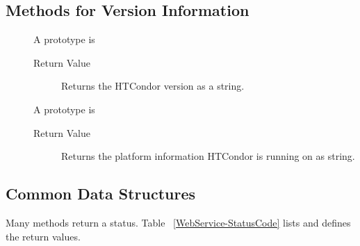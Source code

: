 \subsection{\label{WebService-VersionInformation} Methods for Version Information}

\begin{description}
\item []
  A prototype is 


  \begin{description}
    \item[ Return Value]
      Returns the HTCondor version as a string.
  \end{description}  

\item []
  A prototype is 


  \begin{description}
    \item[ Return Value]
      Returns the platform information HTCondor is running on as string.
  \end{description}  

\end{description}

\subsection{\label{WebService-DataStructures} Common Data Structures}

Many methods return a status.
Table ~\ref{WebService-StatusCode} lists and defines the
 return values.


